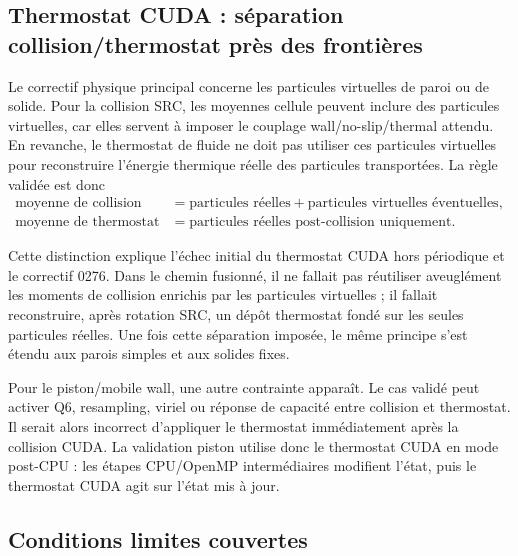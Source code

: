 \documentclass[11pt,a4paper]{article}
\begin{document}
\subsection{Thermostat CUDA : séparation collision/thermostat près des frontières}

Le correctif physique principal concerne les particules virtuelles de paroi ou de solide. Pour la collision SRC, les moyennes cellule peuvent inclure des particules virtuelles, car elles servent à imposer le couplage wall/no-slip/thermal attendu. En revanche, le thermostat de fluide ne doit pas utiliser ces particules virtuelles pour reconstruire l'énergie thermique réelle des particules transportées. La règle validée est donc
\begin{align}
  \text{moyenne de collision} & = \text{particules réelles} + \text{particules virtuelles éventuelles}, \\
  \text{moyenne de thermostat} & = \text{particules réelles post-collision uniquement}.
\end{align}

Cette distinction explique l'échec initial du thermostat CUDA hors périodique et le correctif 0276. Dans le chemin fusionné, il ne fallait pas réutiliser aveuglément les moments de collision enrichis par les particules virtuelles ; il fallait reconstruire, après rotation SRC, un dépôt thermostat fondé sur les seules particules réelles. Une fois cette séparation imposée, le même principe s'est étendu aux parois simples et aux solides fixes.

Pour le piston/mobile wall, une autre contrainte apparaît. Le cas validé peut activer Q6, resampling, viriel ou réponse de capacité entre collision et thermostat. Il serait alors incorrect d'appliquer le thermostat immédiatement après la collision CUDA. La validation piston utilise donc le thermostat CUDA en mode post-CPU : les étapes CPU/OpenMP intermédiaires modifient l'état, puis le thermostat CUDA agit sur l'état mis à jour.


\subsection{Conditions limites couvertes}
\end{document}
